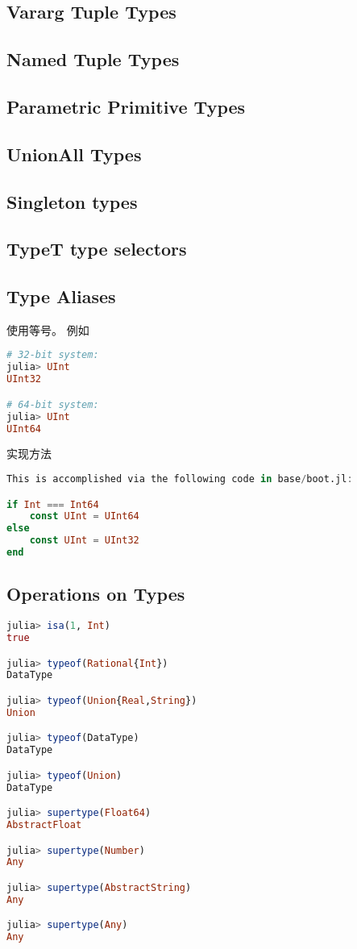 \subsection{Vararg Tuple Types}

\subsection{Named Tuple Types}

\subsection{Parametric Primitive Types}

\subsection{UnionAll Types}

\subsection{Singleton types}

\subsection{Type{T} type selectors}

\subsection{Type Aliases}
使用等号。 例如
\begin{lstlisting}[language=julia]
# 32-bit system:
julia> UInt
UInt32

# 64-bit system:
julia> UInt
UInt64
\end{lstlisting}
实现方法
\begin{lstlisting}[language=julia]
This is accomplished via the following code in base/boot.jl:

if Int === Int64
    const UInt = UInt64
else
    const UInt = UInt32
end
\end{lstlisting}

\subsection{Operations on Types}
\begin{lstlisting}[language=julia]
julia> isa(1, Int)
true

julia> typeof(Rational{Int})
DataType

julia> typeof(Union{Real,String})
Union

julia> typeof(DataType)
DataType

julia> typeof(Union)
DataType

julia> supertype(Float64)
AbstractFloat

julia> supertype(Number)
Any

julia> supertype(AbstractString)
Any

julia> supertype(Any)
Any
\end{lstlisting}
